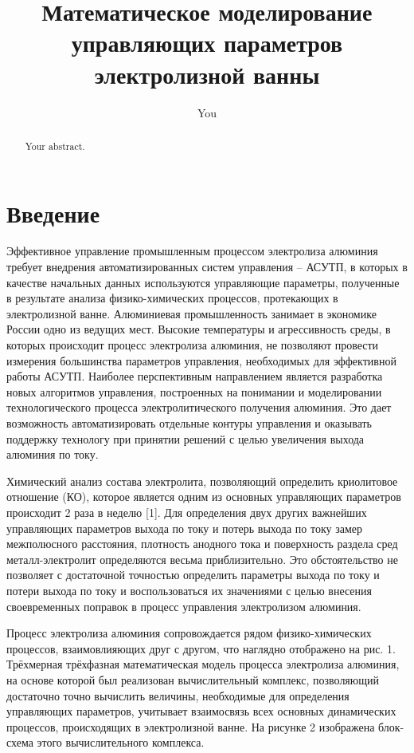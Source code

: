\documentclass{article}
\title{Математическое моделирование управляющих параметров электролизной ванны}
\author{You}
\begin{document}
\maketitle

\begin{abstract}
Your abstract.
\end{abstract}

\section*{Введение}

Эффективное управление промышленным процессом электролиза алюминия требует внедрения автоматизированных систем управления – АСУТП, в которых в качестве начальных данных используются управляющие параметры, полученные в результате анализа физико-химических процессов, протекающих в электролизной ванне. Алюминиевая промышленность занимает в экономике России одно из ведущих мест. Высокие температуры и агрессивность среды, в которых происходит процесс электролиза алюминия, не позволяют провести измерения большинства параметров управления, необходимых для эффективной работы АСУТП. Наиболее перспективным направлением является разработка новых алгоритмов управления, построенных на понимании и моделировании технологического процесса электролитического получения алюминия. Это дает возможность автоматизировать отдельные контуры управления и оказывать поддержку технологу при принятии решений с целью увеличения выхода алюминия по току. 

Химический анализ состава электролита, позволяющий определить криолитовое отношение (КО), которое является одним из основных управляющих параметров происходит 2 раза в неделю [1]. Для определения двух других важнейших управляющих параметров выхода по току и потерь выхода по току замер межполюсного расстояния, плотность анодного тока и поверхность раздела сред металл-электролит определяются весьма приблизительно. Это обстоятельство не позволяет с достаточной точностью определить параметры выхода по току и потери выхода по току и воспользоваться их значениями с целью внесения своевременных поправок в процесс управления электролизом алюминия.

Процесс электролиза алюминия сопровождается рядом физико-химических процессов, взаимовлияющих друг с другом, что наглядно отображено на рис. 1. Трёхмерная трёхфазная математическая модель процесса электролиза алюминия, на основе которой был реализован вычислительный комплекс, позволяющий достаточно точно вычислить величины, необходимые для определения управляющих параметров, учитывает взаимосвязь всех основных динамических процессов, происходящих в электролизной ванне. На рисунке 2 изображена блок-схема этого вычислительного комплекса.
\end{document}
